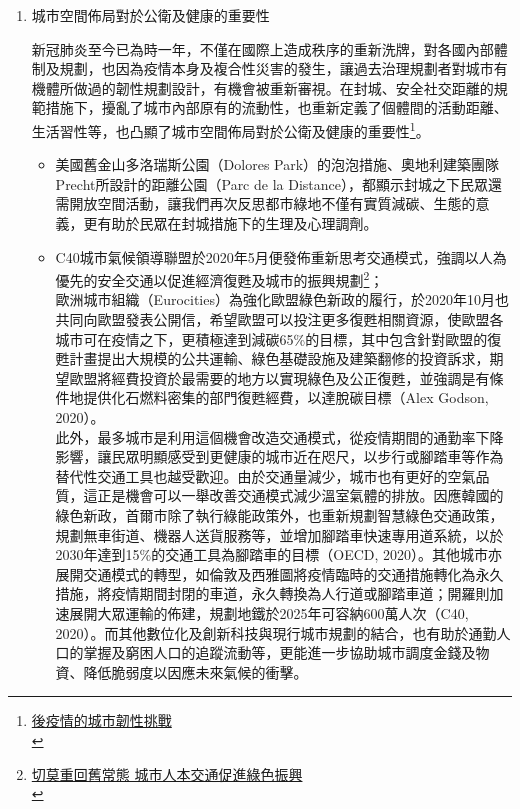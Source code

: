 \documentclass[a4paper,12pt]{article}
\begin{document}
\begin{enumerate}
\item 城市空間佈局對於公衛及健康的重要性
\label{sec:org62c6192}

新冠肺炎至今已為時一年，不僅在國際上造成秩序的重新洗牌，對各國內部體制及規劃，也因為疫情本身及複合性災害的發生，讓過去治理規劃者對城市有機體所做過的韌性規劃設計，有機會被重新審視。在封城、安全社交距離的規範措施下，擾亂了城市內部原有的流動性，也重新定義了個體間的活動距離、生活習性等，也凸顯了城市空間佈局對於公衛及健康的重要性\footnote{\href{https://rsprc.ntu.edu.tw/zh-tw/m01-3/understand-risk-society/1550-1100222-covid.html}{ 後疫情的城市韌性挑戰 }\\}。\\
\begin{itemize}
\item 美國舊金山多洛瑞斯公園（Dolores Park）的泡泡措施、奧地利建築團隊Precht所設計的距離公園（Parc de la Distance），都顯示封城之下民眾還需開放空間活動，讓我們再次反思都市綠地不僅有實質減碳、生態的意義，更有助於民眾在封城措施下的生理及心理調劑。\\
\item C40城市氣候領導聯盟於2020年5月便發佈重新思考交通模式，強調以人為優先的安全交通以促進經濟復甦及城市的振興規劃\footnote{\href{https://rsprc.ntu.edu.tw/zh-tw/m01-3/en-trans/1430-1090525-green-recovery2.html}{ 切莫重回舊常態 城市人本交通促進綠色振興 }\\\label{org4070cbc}}；\\
歐洲城市組織（Eurocities）為強化歐盟綠色新政的履行，於2020年10月也共同向歐盟發表公開信，希望歐盟可以投注更多復甦相關資源，使歐盟各城市可在疫情之下，更積極達到減碳65\%的目標，其中包含針對歐盟的復甦計畫提出大規模的公共運輸、綠色基礎設施及建築翻修的投資訴求，期望歐盟將經費投資於最需要的地方以實現綠色及公正復甦，並強調是有條件地提供化石燃料密集的部門復甦經費，以達脫碳目標（Alex Godson, 2020）。\\

此外，最多城市是利用這個機會改造交通模式，從疫情期間的通勤率下降影響，讓民眾明顯感受到更健康的城市近在咫尺，以步行或腳踏車等作為替代性交通工具也越受歡迎。由於交通量減少，城市也有更好的空氣品質，這正是機會可以一舉改善交通模式減少溫室氣體的排放。因應韓國的綠色新政，首爾市除了執行綠能政策外，也重新規劃智慧綠色交通政策，規劃無車街道、機器人送貨服務等，並增加腳踏車快速專用道系統，以於2030年達到15\%的交通工具為腳踏車的目標（OECD, 2020）。其他城市亦展開交通模式的轉型，如倫敦及西雅圖將疫情臨時的交通措施轉化為永久措施，將疫情期間封閉的車道，永久轉換為人行道或腳踏車道；開羅則加速展開大眾運輸的佈建，規劃地鐵於2025年可容納600萬人次（C40, 2020）。而其他數位化及創新科技與現行城市規劃的結合，也有助於通勤人口的掌握及窮困人口的追蹤流動等，更能進一步協助城市調度金錢及物資、降低脆弱度以因應未來氣候的衝擊。\\


\end{itemize}
\end{enumerate}
\end{document}
